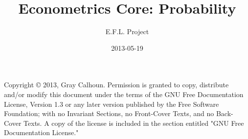 \documentclass[nofonts]{tufte-latex/tufte-book}
\title{Econometrics Core: Probability}
\author{E.F.L. Project}
\date{2013-05-19}
\begin{document}
\maketitle

Copyright © 2013, Gray Calhoun.  Permission is granted to copy,
distribute and/or modify this document under the terms of the GNU Free
Documentation License, Version 1.3 or any later version published by
the Free Software Foundation; with no Invariant Sections, no
Front-Cover Texts, and no Back-Cover Texts.  A copy of the license is
included in the section entitled "GNU Free Documentation License."

\tableofcontents






\appendix

\end{document}
